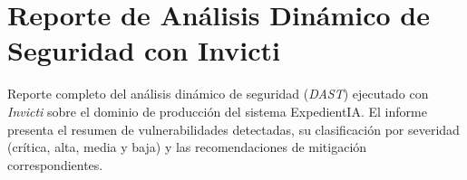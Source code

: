 \documentclass[12pt,a4paper,oneside]{book}
\begin{document}


\chapter{Reporte de Análisis Dinámico de Seguridad con Invicti}
\label{anexo:invicti}

Reporte completo del análisis dinámico de seguridad (\textit{DAST}) ejecutado con \textit{Invicti} sobre el dominio de producción del sistema ExpedientIA. El informe presenta el resumen de vulnerabilidades detectadas, su clasificación por severidad (crítica, alta, media y baja) y las recomendaciones de mitigación correspondientes.


\end{document}

